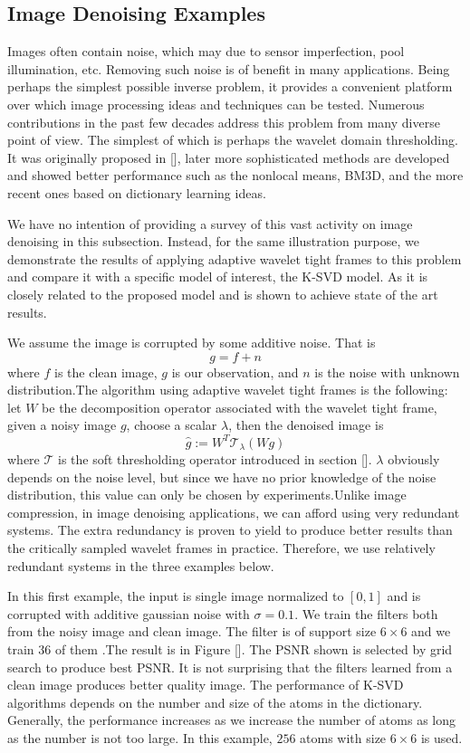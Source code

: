 \documentclass[a4paper]{article}
\begin{document}
\subsection{Image Denoising Examples}
Images often contain noise, which may due to sensor imperfection, pool illumination, etc. Removing such noise is of benefit in many applications. Being perhaps the simplest possible inverse problem, it provides a convenient platform over which image processing ideas and techniques can be tested. Numerous contributions in the past few decades address this problem from many diverse point of view. The simplest of which is perhaps the wavelet domain thresholding.  It was originally proposed in [], later more sophisticated methods are developed and showed better performance such as the nonlocal means, BM3D, and the more recent ones based on dictionary learning ideas. 

We have no intention of providing a survey of this vast activity on image denoising in this subsection. Instead, for the same illustration purpose, we demonstrate the results of applying adaptive wavelet tight frames to this problem and compare it with a specific model of interest, the K-SVD model. As it is closely related to the proposed model and is shown to achieve state of the art results.

We assume the image is corrupted by some additive noise. That is 
\[
	g=f+n
\]
where $f$ is the clean image, $g$ is our observation, and $n$ is the noise with unknown distribution.The algorithm using adaptive wavelet tight frames is the following: let $W$ be the decomposition operator associated with the wavelet tight frame, given a noisy image $g$, choose a scalar $\lambda$, then the denoised image is
\[
	\hat{g} :=W^T \mathcal{T}_{\lambda} (Wg)
\]
where $\mathcal{T}$ is the soft thresholding operator introduced in section []. $\lambda$ obviously depends on the noise level, but since we have no prior knowledge of the noise distribution, this value can only be chosen by experiments.Unlike image compression, in image denoising applications, we can afford using very redundant systems. The extra redundancy is proven to yield to produce better results than the critically sampled wavelet frames in practice. Therefore, we use relatively redundant systems in the three examples below.

In this first example, the input is single image normalized to $[0,1]$ and is corrupted with additive gaussian noise with $\sigma=0.1$. We train the filters both from the noisy image and clean image. The filter is of support size $6\times 6$ and we train $36$ of them .The result is in Figure [].  The PSNR shown is selected by grid search to produce best PSNR. It is not surprising that the filters learned from a clean image produces better quality image. The performance of K-SVD algorithms depends on the number and size of the atoms in the dictionary. Generally, the performance increases as we increase the number of atoms as long as the number is not too large. In this example, $256$ atoms with size $6\times 6$ is used.
\end{document}
